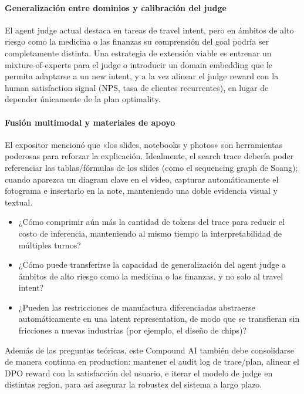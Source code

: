 \paragraph{Generalización entre dominios y calibración del judge}
El agent judge actual destaca en tareas de travel intent, pero en ámbitos de alto riesgo como la medicina o las finanzas su comprensión del goal podría ser completamente distinta. Una estrategia de extensión viable es entrenar un mixture-of-experts para el judge o introducir un domain embedding que le permita adaptarse a un new intent, y a la vez alinear el judge reward con la human satisfaction signal (NPS, tasa de clientes recurrentes), en lugar de depender únicamente de la plan optimality.

\paragraph{Fusión multimodal y materiales de apoyo}
El expositor mencionó que «los slides, notebooks y photos» son herramientas poderosas para reforzar la explicación. Idealmente, el search trace debería poder referenciar las tablas/fórmulas de los slides (como el sequencing graph de Soang); cuando aparezca un diagram clave en el video, capturar automáticamente el fotograma e insertarlo en la note, manteniendo una doble evidencia visual y textual.

\begin{itemize}
    \item ¿Cómo comprimir aún más la cantidad de tokens del trace para reducir el costo de inferencia, manteniendo al mismo tiempo la interpretabilidad de múltiples turnos?
    \item ¿Cómo puede transferirse la capacidad de generalización del agent judge a ámbitos de alto riesgo como la medicina o las finanzas, y no solo al travel intent?
    \item ¿Pueden las restricciones de manufactura diferenciadas abstraerse automáticamente en una latent representation, de modo que se transfieran sin fricciones a nuevas industrias (por ejemplo, el diseño de chips)?
\end{itemize}

Además de las preguntas teóricas, este Compound AI también debe consolidarse de manera continua en production: mantener el audit log de trace/plan, alinear el DPO reward con la satisfacción del usuario, e iterar el modelo de judge en distintas region, para así asegurar la robustez del sistema a largo plazo.

